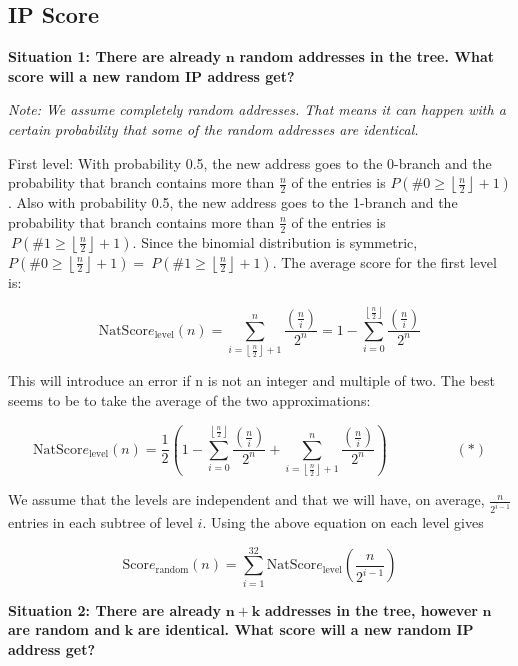 \subsection{IP Score}
\textbf{Situation 1: There are already} \(\mathbf{n}\) \textbf{random
addresses in the tree. What score will a new random IP address get?}

\emph{Note: We assume completely random addresses. That means it can
happen with a certain probability that some of the random addresses are
identical.}

First level: With probability 0.5, the new address goes to the 0-branch
and the probability that branch contains more than \(\frac{n}{2}\) of
the entries is
\(P(\# 0 \geq \left\lfloor \frac{n}{2} \right\rfloor + 1)\). Also with
probability 0.5, the new address goes to the 1-branch and the
probability that branch contains more than \(\frac{n}{2}\) of the
entries is\(\ P(\# 1 \geq \left\lfloor \frac{n}{2} \right\rfloor + 1).\)
Since the binomial distribution is symmetric,
\(P\left( \# 0 \geq \left\lfloor \frac{n}{2} \right\rfloor + 1 \right) = \ P(\# 1 \geq \left\lfloor \frac{n}{2} \right\rfloor + 1)\).
The average score for the first level is:

\[\text{NatScor}e_{\text{level}}(n) = \sum_{i = \left\lfloor \frac{n}{2} \right\rfloor + 1}^{n}\frac{\left( \frac{n}{i} \right)}{2^{n}} = 1 - \sum_{i = 0}^{\left\lfloor \frac{n}{2} \right\rfloor}\frac{\left( \frac{n}{i} \right)}{2^{n}}\]

This will introduce an error if n is not an integer and multiple of two.
The best seems to be to take the average of the two approximations:

\[\text{NatScor}e_{\text{level}}(n) = \frac{1}{2}\left( 1 - \sum_{i = 0}^{\left\lfloor \frac{n}{2} \right\rfloor}\frac{\left( \frac{n}{i} \right)}{2^{n}} + \sum_{i = \left\lfloor \frac{n}{2} \right\rfloor + 1}^{n}\frac{\left( \frac{n}{i} \right)}{2^{n}} \right)\ \ \ \ \ \ \ \ \ \ \ \ \ \ \ \ \ \ \ \ \ \ (*)\]

We assume that the levels are independent and that we will have, on
average, \(\frac{n}{2^{i - 1}}\) entries in each subtree of level \(i\).
Using the above equation on each level gives

\[\text{Scor}e_{\text{random}}(n) = \sum_{i = 1}^{32}{\text{NatScor}e_{\text{level}}\left( \frac{n}{2^{i - 1}} \right)}\]

\textbf{\hfill\break
}

\textbf{Situation 2: There are already} \(\mathbf{n + k}\)
\textbf{addresses in the tree, however} \(\mathbf{n}\) \textbf{are
random and} \(\mathbf{k}\) \textbf{are identical. What score will a new
random IP address get?}

